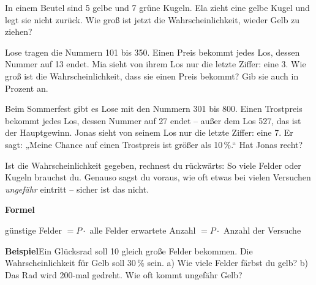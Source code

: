 \documentclass[11pt]{article}
\newcommand{\aufg}[3]{\par\noindent\makebox[0pt][r]{#3}\begin{minipage}[t]{\linewidth}#1\end{minipage}\par}
\newcommand{\nr}[1]{\makebox[7mm][l]{\textbf{#1}}}
\newlength{\kr}
\begin{document}
\medskip
\aufg{\nr{2.}In einem Beutel sind 5 gelbe und 7 grüne Kugeln. Ela zieht eine gelbe Kugel und legt sie nicht zurück. Wie groß ist jetzt die Wahrscheinlichkeit, wieder Gelb zu ziehen?}{}{}
\medskip
\aufg{\nr{3.}Lose tragen die Nummern 101 bis 350. Einen Preis bekommt jedes Los, dessen Nummer auf 13 endet. Mia sieht von ihrem Los nur die letzte Ziffer: eine 3. Wie groß ist die Wahrscheinlichkeit, dass sie einen Preis bekommt? Gib sie auch in Prozent an.}{}{}
\medskip
\aufg{\nr{4.}Beim Sommerfest gibt es Lose mit den Nummern 301 bis 800. Einen Trostpreis bekommt jedes Los, dessen Nummer auf 27 endet – außer dem Los 527, das ist der Hauptgewinn. Jonas sieht von seinem Los nur die letzte Ziffer: eine 7. Er sagt: „Meine Chance auf einen Trostpreis ist größer als 10\,\%.“ Hat Jonas recht?}{}{{\scriptsize\color{mbgrau}Ziel\hspace{2mm}}}
\medskip
\par\vspace{3mm}\setlength{\kr}{\dimexpr\pagegoal-\pagetotal-10mm\relax}%
\ifdim\kr>12mm\noindent{\scriptsize\color{mbgrau}Platz zum Rechnen}\par\nointerlineskip\vspace{1mm}\noindent
\begin{tikzpicture}\clip (0,0) rectangle ({\linewidth-0.5mm},\kr);\draw[black!16,line width=0.3pt,step=5mm] (0,0) grid (\linewidth,\kr);\end{tikzpicture}\fi\par
\clearpage\label{s:E}\noindent\colorbox{black!12}{}\hspace{3mm}{\Large\bfseries Zufallsgerät bauen und vorhersagen}\par\smallskip
\noindent Ist die Wahrscheinlichkeit gegeben, rechnest du rückwärts: So viele Felder oder Kugeln brauchst du. Genauso sagst du voraus, wie oft etwas bei vielen Versuchen \emph{ungefähr} eintritt – sicher ist das nicht.\par\medskip
\noindent\textbf{Formel}\par\nopagebreak\noindent\hspace*{4mm}\begin{minipage}{\dimexpr\linewidth-4mm\relax}günstige Felder $= P \cdot$ alle Felder \qquad erwartete Anzahl $= P \cdot$ Anzahl der Versuche\end{minipage}\par\medskip
\noindent\textbf{Beispiel}\quad Ein Glücksrad soll 10 gleich große Felder bekommen. Die Wahrscheinlichkeit für Gelb soll 30\,\% sein. a) Wie viele Felder färbst du gelb? b) Das Rad wird 200-mal gedreht. Wie oft kommt ungefähr Gelb?\par\smallskip
\end{document}
